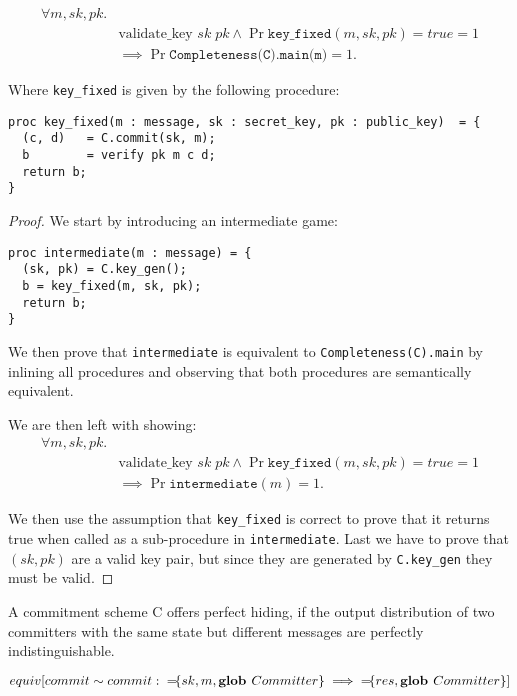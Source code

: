 \begin{lemma}
  \begin{align*}
    \forall m,sk,pk.& \\
    &\text{validate\_key } sk \; pk \land \Pr{\texttt{key\_{fixed}}(m, sk, pk) = true} = 1 \\
    & \implies \Pr{\texttt{Completeness(C).main(m)}} = 1.
  \end{align*}

  Where \texttt{key\_fixed} is given by the following procedure:

\begin{lstlisting}
proc key_fixed(m : message, sk : secret_key, pk : public_key)  = {
  (c, d)   = C.commit(sk, m);
  b        = verify pk m c d;
  return b;
}
\end{lstlisting}
\end{lemma}
\begin{proof}
  We start by introducing an intermediate game:
\begin{lstlisting}
proc intermediate(m : message) = {
  (sk, pk) = C.key_gen();
  b = key_fixed(m, sk, pk);
  return b;
}
\end{lstlisting}
  We then prove that \texttt{intermediate} is equivalent to
  \texttt{Completeness(C).main} by inlining all procedures and observing that
  both procedures are semantically equivalent.

  We are then left with showing:
  \begin{align*}
    \forall m,sk,pk.& \\
    &\text{validate\_key } sk \; pk \land \Pr{\texttt{key\_{fixed}}(m, sk, pk) = true} = 1 \\
    & \implies \Pr{\texttt{intermediate}(m)} = 1.
  \end{align*}

  We then use the assumption that \texttt{key\_fixed} is correct to prove that
  it returns true when called as a sub-procedure in \texttt{intermediate}. Last
  we have to prove that $(sk, pk)$ are a valid key pair, but since they are
  generated by \texttt{C.key\_gen} they must be valid.
\end{proof}

\begin{definition}
  \label{def:commitment:perfect-hiding}
  A commitment scheme C offers perfect hiding, if the output distribution of two
  committers with the same state but different messages are perfectly
  indistinguishable.

  \[
    equiv[commit \sim commit :\; {=}\!\{sk, m, \textbf{glob } Committer\} \implies {=}\!\{res, \textbf{glob } Committer\} ]
  \]

\end{definition}

